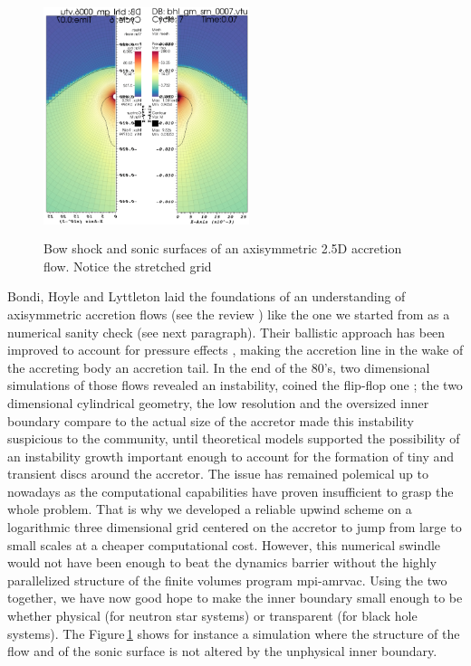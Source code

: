 \documentclass[
    a4paper, 
    12pt, onecolumn,
]{article}
\begin{document}
\begin{figure}
\vspace*{-23pt}
\includegraphics[height=7cm, width=6cm]{shock_independent_inner_boundary_size}
\caption{Bow shock and sonic surfaces of an axisymmetric 2.5D accretion flow. Notice the stretched grid}
\label{fig:bow2.5d}
\vspace*{-23pt}
\end{figure} 

\indent B{\sc ondi}, H{\sc oyle} and L{\sc yttleton} laid the foundations of an understanding of axisymmetric accretion flows (see the review \citep{Edgar:2004ip}) like the one we started from as a numerical sanity check (see next paragraph). Their ballistic approach has been improved to account for pressure effects \citep{Horedt2000}, making the accretion line in the wake of the accreting body an accretion tail. In the end of the 80's, two dimensional simulations of those flows \citep{Matsuda1987,Fryxell1988} revealed an instability, coined the flip-flop one ; the two dimensional cylindrical geometry, the low resolution and the oversized inner boundary compare to the actual size of the accretor made this instability suspicious to the community, until theoretical models \citep{Foglizzo2005} supported the possibility of an instability growth important enough to account for the formation of tiny and transient discs around the accretor. The issue has remained polemical up to nowadays as the computational capabilities have proven insufficient to grasp the whole problem. That is why we developed a reliable upwind scheme on a logarithmic three dimensional grid centered on the accretor to jump from large to small scales at a cheaper computational cost. However, this numerical swindle would not have been enough to beat the dynamics barrier without the highly parallelized structure of the finite volumes program {\sc mpi}-{\sc amrvac}. Using the two together, we have now good hope to make the inner boundary small enough to be whether physical (for neutron star systems) or transparent (for black hole systems). The Figure\,\ref{fig:bow2.5d} shows for instance a simulation where the structure of the flow and of the sonic surface is not altered by the unphysical inner boundary.\\
\end{document}
